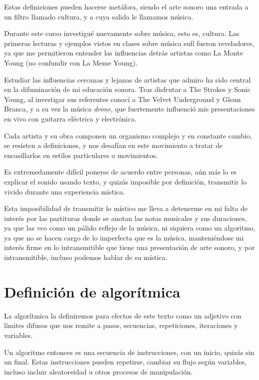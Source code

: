 \documentclass{article}
\begin{document}
Estas definiciones pueden hacerse metáfora, siendo el arte sonoro una entrada a un filtro llamado cultura, y a cuya salida le llamamos música.

Durante este curso investigué nuevamente sobre música, esto es, cultura. Las primeras lecturas y ejemplos vistos en clases sobre música sufí fueron reveladores, ya que me permitieron entender las influencias detrás artistas como La Monte Young (no confundir con La Meme Young).

Estudiar las influencias cercanas y lejanas de artistas que admiro ha sido central en la difuminación de mi educación sonora. Tras disfrutar a The Strokes y Sonic Young, al investigar sus referentes conocí a The Velvet Underground y Glenn Branca, y a su vez la música \textit{drone}, que fuertemente influenció mis presentaciones en vivo con guitarra eléctrica y electrónica.

Cada artista y su obra componen un organismo complejo y en constante cambio, se resisten a definiciones, y nos desafían en este movimiento a tratar de encasillarlos en estilos particulares o movimientos.

Es extremedamente difícil ponerse de acuerdo entre personas, aún más lo es explicar el sonido usando texto, y quizás imposible por definición, transmitir lo vivido durante una experiencia mística.

Esta imposibilidad de transmitir lo místico me lleva a detenerme en mi falta de interés por las partituras donde se anotan las notas musicales y sus duraciones, ya que las veo como un pálido reflejo de la música, ni siquiera como un algoritmo, ya que no se hacen cargo de lo imperfecta que es la música, manteniéndose mi interés firme en lo intransmitible que tiene una presentación de arte sonoro, y por intransmitible, incluso podemos hablar de su mística.

\clearpage

\section{Definición de algorítmica}

La algorítmica la definiremos para efectos de este texto como un adjetivo con límites difusos que nos remite a pasos, secuencias, repeticiones, iteraciones y variables.

Un algoritmo entonces es una secuencia de instrucciones, con un inicio, quizás sin un final. Estas instrucciones pueden repetirse, cambiar su flujo según variables, incluso incluir aleatoreidad u otros procesos de manipulación.
\end{document}
